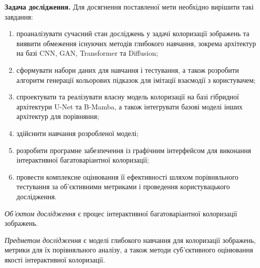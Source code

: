     \textbf{Задача дослідження.}
        Для досягнення поставленої мети необхідно вирішити такі завдання:
        \begin{enumerate}
            \item проаналізувати сучасний стан досліджень у задачі колоризації зображень та виявити обмеження існуючих методів глибокого навчання, зокрема архітектур на базі CNN, GAN, Transformer та Diffusion;
            \item сформувати набори даних для навчання і тестування, а також розробити алгоритм генерації кольорових підказок для імітації взаємодії з користувачем;
            \item спроектувати та реалізувати власну модель колоризації на базі гібридної архітектури U-Net та B-Mamba, а також інтегрувати базові моделі інших архітектур для порівняння;
            \item здійснити навчання розробленої моделі;
            \item розробити програмне забезпечення із графічним інтерфейсом для виконання інтерактивної багатоваріантної колоризації;
            \item провести комплексне оцінювання її ефективності шляхом порівняльного тестування за об'єктивними метриками і проведення користувацького дослідження.
        \end{enumerate}

    \emph{Об'єктом дослідження}
        є процес інтерактивної багатоваріантної колоризації зображень.

    \emph{Предметом дослідження}
        є моделі глибокого навчання для колоризації зображень,
        метрики для їх порівняльного аналізу,
        а також методи суб'єктивного оцінювання якості інтерактивної колоризації.

